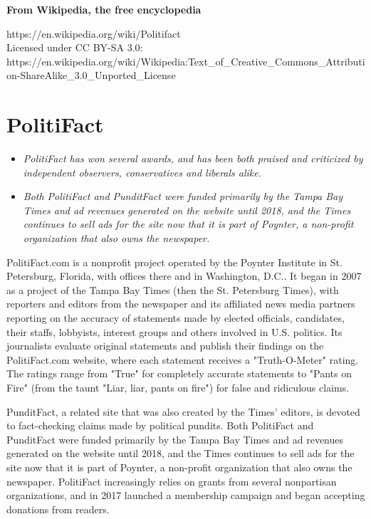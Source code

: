 \textbf{From Wikipedia, the free encyclopedia}

https://en.wikipedia.org/wiki/Politifact\\
Licensed under CC BY-SA 3.0:\\
https://en.wikipedia.org/wiki/Wikipedia:Text\_of\_Creative\_Commons\_Attribution-ShareAlike\_3.0\_Unported\_License

\section{PolitiFact}\label{politifact}

\begin{itemize}
\item
  \emph{PolitiFact has won several awards, and has been both praised and
  criticized by independent observers, conservatives and liberals
  alike.}
\item
  \emph{Both PolitiFact and PunditFact were funded primarily by the
  Tampa Bay Times and ad revenues generated on the website until 2018,
  and the Times continues to sell ads for the site now that it is part
  of Poynter, a non-profit organization that also owns the newspaper.}
\end{itemize}

PolitiFact.com is a nonprofit project operated by the Poynter Institute
in St. Petersburg, Florida, with offices there and in Washington, D.C..
It began in 2007 as a project of the Tampa Bay Times (then the St.
Petersburg Times), with reporters and editors from the newspaper and its
affiliated news media partners reporting on the accuracy of statements
made by elected officials, candidates, their staffs, lobbyists, interest
groups and others involved in U.S. politics. Its journalists evaluate
original statements and publish their findings on the PolitiFact.com
website, where each statement receives a "Truth-O-Meter" rating. The
ratings range from "True" for completely accurate statements to "Pants
on Fire" (from the taunt "Liar, liar, pants on fire") for false and
ridiculous claims.

PunditFact, a related site that was also created by the Times' editors,
is devoted to fact-checking claims made by political pundits. Both
PolitiFact and PunditFact were funded primarily by the Tampa Bay Times
and ad revenues generated on the website until 2018, and the Times
continues to sell ads for the site now that it is part of Poynter, a
non-profit organization that also owns the newspaper. PolitiFact
increasingly relies on grants from several nonpartisan organizations,
and in 2017 launched a membership campaign and began accepting donations
from readers.

